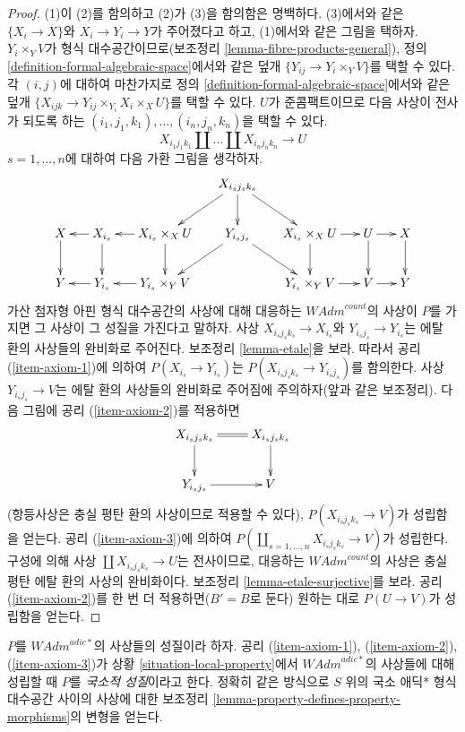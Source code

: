 \begin{proof}
(1)이 (2)를 함의하고 (2)가 (3)을 함의함은 명백하다. (3)에서와
같은 $\{X_i \to X\}$와 $X_i \to Y_i \to Y$가 주어졌다고 하고,
(1)에서와 같은 그림을 택하자. $Y_i \times_Y V$가 형식
대수공간이므로(보조정리 \ref{lemma-fibre-products-general}), 정의
\ref{definition-formal-algebraic-space}에서와 같은 덮개
$\{Y_{ij} \to Y_i \times_Y V\}$를 택할 수 있다. 각 $(i, j)$에
대하여 마찬가지로 정의 \ref{definition-formal-algebraic-space}에서와
같은 덮개
$\{X_{ijk} \to Y_{ij} \times_{Y_i} X_i \times_X U\}$를 택할 수
있다. $U$가 준콤팩트이므로 다음 사상이 전사가 되도록 하는
$(i_1, j_1, k_1), \ldots, (i_n, j_n, k_n)$을 택할 수 있다.
$$
X_{i_1 j_1 k_1} \amalg \ldots \amalg X_{i_n j_n k_n} \longrightarrow U
$$
$s = 1, \ldots, n$에 대하여 다음 가환 그림을 생각하자.
$$
\xymatrix@C=1.5em{
& & & X_{i_s j_s k_s} \ar[ld] \ar[d] \ar[rd] \\
X \ar[d] & X_{i_s} \ar[l] \ar[d] &
X_{i_s} \times_X U \ar[l] \ar[d] & Y_{i_s j_s} \ar[ld] \ar[rd] &
X_{i_s} \times_X U \ar[d] \ar[r] &
U \ar[d] \ar[r] & X \ar[d] \\
Y & Y_{i_s} \ar[l] &
Y_{i_s} \times_Y V \ar[l] & &
Y_{i_s} \times_Y V \ar[r] &
V \ar[r] & Y
}
$$
가산 첨자형 아핀 형식 대수공간의 사상에 대해 대응하는
$\textit{WAdm}^{count}$의 사상이 $P$를 가지면 그 사상이 그 성질을
가진다고 말하자. 사상 $X_{i_s j_s k_s} \to X_{i_s}$와
$Y_{i_s j_s} \to Y_{i_s}$는 에탈 환의 사상들의 완비화로 주어진다.
보조정리 \ref{lemma-etale}을 보라. 따라서 공리
(\ref{item-axiom-1})에 의하여 $P(X_{i_s} \to Y_{i_s})$는
$P(X_{i_s j_s k_s} \to Y_{i_s j_s})$를 함의한다. 사상
$Y_{i_s j_s} \to V$는 에탈 환의 사상들의 완비화로 주어짐에
주의하자(앞과 같은 보조정리). %
다음 그림에 공리 (\ref{item-axiom-2})를 적용하면
$$
\xymatrix{
X_{i_s j_s k_s} \ar@{=}[r] \ar[d] & X_{i_s j_s k_s} \ar[d] \\
Y_{i_s j_s} \ar[r] & V
}
$$
(항등사상은 충실 평탄 환의 사상이므로 적용할 수 있다),
$P(X_{i_s j_s k_s} \to V)$가 성립함을 얻는다. 공리
(\ref{item-axiom-3})에 의하여
$P(\coprod_{s = 1, \ldots, n} X_{i_s j_s k_s} \to V)$가 성립한다.
구성에 의해 사상 $\coprod X_{i_s j_s k_s} \to U$는 전사이므로,
대응하는 $\textit{WAdm}^{count}$의 사상은 충실 평탄 에탈 환의
사상의 완비화이다. 보조정리 \ref{lemma-etale-surjective}를 보라.
공리 (\ref{item-axiom-2})를 한 번 더 적용하면($B' = B$로 둔다)
원하는 대로 $P(U \to V)$가 성립함을 얻는다.
\end{proof}

\begin{remark}[애딕* 변형]
\label{remark-variant-adic-star}
$P$를 $\textit{WAdm}^{adic*}$의 사상들의 성질이라 하자. 공리
(\ref{item-axiom-1}), (\ref{item-axiom-2}), (\ref{item-axiom-3})가
상황 \ref{situation-local-property}에서 $\textit{WAdm}^{adic*}$의
사상들에 대해 성립할 때 $P$를
{\it 국소적 성질}이라고 한다. 정확히 같은 방식으로 $S$ 위의 국소
애딕* 형식 대수공간 사이의 사상에 대한 보조정리
\ref{lemma-property-defines-property-morphisms}의 변형을 얻는다.
\end{remark}

